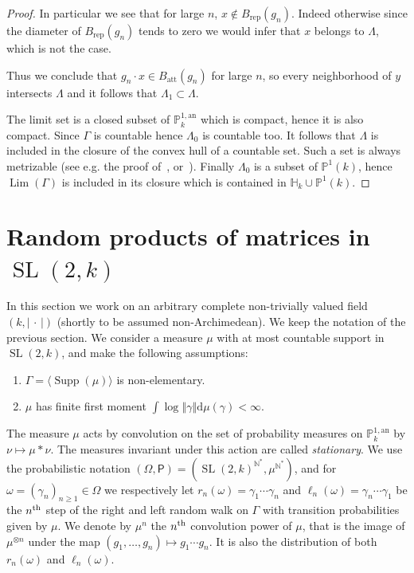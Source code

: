\documentclass[10pt]{amsart}
\theoremstyle{definition}\newtheorem{defi}[theo]{Definition}\newtheorem{rema}[theo]{Remark}\newtheorem{exam}[theo]{Example}\newtheorem{exem}[theo]{Example}\newtheorem{nota}[theo]{Notation}
\DeclareMathOperator{\supp}{Supp}
\DeclareMathOperator{\Lm}{Lim}
\DeclareMathOperator{\SL}{SL}
\newcommand{\nn}{\mathbb{N}}
\newcommand{\hh}{\mathbb{H}}
\newcommand{\prob}{\mathsf{P}}
\newcommand{\an}{\mathrm{an}}
\newcommand{\om}{\Omega}
\newcommand{\norm}[1]{\left\Vert#1\right\Vert}
\newcommand{\abs}[1]{\left\vert#1\right\vert}
\newcommand{\PP}{\mathbb{P}}
\newcommand{\berk}{{\mathbb{P}^{1, \mathrm{an}}_k}}
\newcommand{\att}{\mathrm{att}}
\newcommand{\rep}{\mathrm{rep}}
\newcommand{\SLk}{\SL(2,k)}
\newcommand*{\dd}{\mathrm{d}}
\newcommand*{\dmu}{\dd \mu}
\begin{document}
\begin{proof}
In particular we see that for large $n$, $x\notin B_{\rep}(g_n)$. Indeed otherwise since the diameter of $B_{\rep}(g_n)$ tends to zero we would infer that $x$ belongs to $\Lambda$, which is not the case.

Thus we conclude that $g_n\cdot x\in B_{\att}(g_n)$ for large $n$, so every neighborhood of $y$ intersects $\Lambda$ and it follows that $\Lambda_1\subset\Lambda$.


The limit set is a closed subset of $\PP^{1,\an}_k$ which is compact, hence it is also compact. Since $\Gamma$ is countable hence $\Lambda_0$ is countable too. It follows that $\Lambda$ is included in the closure of the convex hull of a countable set. Such a set is always metrizable (see e.g. the proof of~\cite[Lem.~7.15]{valtree}, or~\cite[Lem.~5.7]{baker-rumely}). Finally $\Lambda_0$ is a subset of $\PP^1(k)$, hence $\Lm(\Gamma)$ is included in its closure which is contained in $\hh_k \cup \PP^1(k)$.
\end{proof}


\section{Random products of matrices in \texorpdfstring{$\SLk$}{SLk}}\label{sec:furstenberg}

In this section we work on an arbitrary complete non-trivially valued field $(k, \abs{{\,\cdot\,}})$ (shortly to be assumed non-Archimedean). We keep the notation of the previous section. We consider a measure $\mu$ with at most countable support in $\SLk$, and make the following assumptions:
\begin{enumerate}\renewcommand{\theenumi}{B\arabic{enumi}}
\item \label{B1} $\Gamma = \langle \supp(\mu) \rangle$ is non-elementary.
\item \label{B2} $\mu$ has finite first moment $ \int \log \norm{\gamma} \dmu(\gamma)<\infty$.
\end{enumerate}

The measure $\mu$ acts by convolution on the set of probability measures on $\berk$ by $\nu \mapsto \mu \ast \nu$. The measures invariant under this action are called \emph{stationary}. We use the probabilistic notation $(\om, \prob) = (\SLk^{\nn^*}, \mu^{\nn^*})$, and for $\omega = (\gamma_n)_{n\geq 1}\in \om$ we respectively let $r_n(\omega) = \gamma_1\cdots \gamma_n$ and $\ell_n(\omega) = \gamma_n\cdots \gamma_1$ be the $n^{\rm th}$ step of the right and left random walk on $\Gamma$ with transition probabilities given by $\mu$. We denote by $\mu^n$ the $n^{\rm th}$ convolution power of $\mu$, that is the image of $\mu^ {\otimes n}$ under the map $(g_1, \ldots,g_n)\mapsto g_1\cdots g_n$. It is also the distribution of both $r_n(\omega)$ and $\ell_n(\omega)$.
\end{document}
